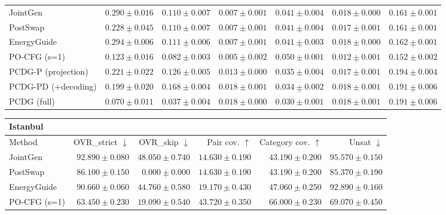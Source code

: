 \begin{table}[t]
\begin{tabular}{lrrrrrr}
\midrule
JointGen & $0.290\pm 0.016$ & $0.110\pm 0.007$ & $\mathbf{0.007\pm 0.001}$ & $0.041\pm 0.004$ & $0.018\pm 0.000$ & $\mathbf{0.161\pm 0.001}$ \\
PostSwap & $\underline{0.228\pm 0.045}$ & $\mathbf{0.110\pm 0.007}$ & $\mathbf{0.007\pm 0.001}$ & $\underline{0.041\pm 0.004}$ & $\mathbf{0.017\pm 0.001}$ & $\mathbf{0.161\pm 0.001}$ \\
EnergyGuide & $0.294\pm 0.006$ & $\underline{0.111\pm 0.006}$ & $\mathbf{0.007\pm 0.001}$ & $\underline{0.041\pm 0.003}$ & $0.018\pm 0.000$ & $\underline{0.162\pm 0.001}$ \\
PO-CFG (s=1) & $\mathbf{0.123\pm 0.016}$ & $0.082\pm 0.003$ & $\underline{0.005\pm 0.002}$ & $0.050\pm 0.001$ & $\underline{0.012\pm 0.001}$ & $0.152\pm 0.002$ \\
\midrule
\textsc{PCDG-P} (projection) & $0.221\pm 0.022$ & $0.126\pm 0.005$ & $0.013\pm 0.000$ & $\mathbf{0.035\pm 0.004}$ & $\mathbf{0.017\pm 0.001}$ & $0.194\pm 0.004$ \\
\textsc{PCDG-PD} ($+$decoding) & $0.199\pm 0.020$ & $0.168\pm 0.004$ & $0.018\pm 0.001$ & $\underline{0.034\pm 0.002}$ & $0.018\pm 0.001$ & $\underline{0.191\pm 0.006}$ \\
\textsc{PCDG} (full) & $\underline{0.070\pm 0.011}$ & $\underline{0.037\pm 0.004}$ & $0.018\pm 0.000$ & $\mathbf{0.030\pm 0.001}$ & $0.018\pm 0.001$ & $\underline{0.191\pm 0.006}$ \\
\bottomrule
\end{tabular}
\par\medskip
\begin{tabular}{lrrrrr}
\toprule
\multicolumn{6}{l}{\textbf{Istanbul}} \\
\midrule
Method & OVR\_strict $\downarrow$ & OVR\_skip $\downarrow$ & Pair cov. $\uparrow$ & Category cov. $\uparrow$ & Unsat $\downarrow$ \\
\midrule
JointGen & $92.890\pm 0.080$ & $48.050\pm 0.740$ & $\mathbf{14.630\pm 0.190}$ & $\mathbf{43.190\pm 0.200}$ & $95.570\pm 0.150$ \\
PostSwap & $\underline{86.100\pm 0.150}$ & $\underline{0.000\pm 0.000}$ & $\mathbf{14.630\pm 0.190}$ & $\mathbf{43.190\pm 0.200}$ & $\underline{85.370\pm 0.190}$ \\
EnergyGuide & $90.660\pm 0.060$ & $44.760\pm 0.580$ & $\underline{19.170\pm 0.430}$ & $\underline{47.060\pm 0.250}$ & $92.890\pm 0.160$ \\
PO-CFG (s=1) & $\mathbf{63.450\pm 0.230}$ & $\mathbf{19.090\pm 0.540}$ & $43.720\pm 0.350$ & $66.000\pm 0.230$ & $\mathbf{69.070\pm 0.450}$ \\

\end{tabular}
\end{table}

